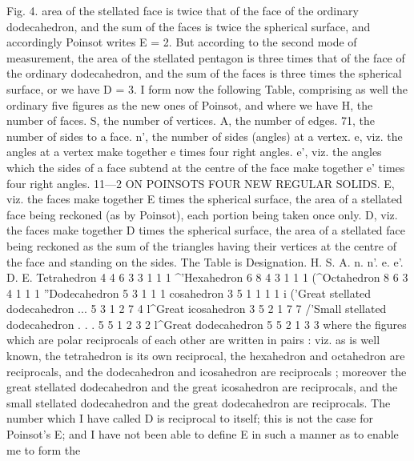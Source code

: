 \documentclass[11pt,a4paper]{book}
\begin{document}
Fig.  4.
area  of  the  stellated  face  is  twice  that  of  the  face  of  the  ordinary  dodecahedron,  and
the  sum  of  the  faces  is  twice  the  spherical  surface,  and  accordingly  Poinsot  writes
E  =  2.  But  according  to  the  second  mode  of  measurement,  the  area  of  the  stellated
pentagon  is  three  times  that  of  the  face  of  the  ordinary  dodecahedron,  and  the  sum  of
the  faces  is  three  times  the  spherical  surface,  or  we  have  D  =  3.
I    form  now   the   following  Table,   comprising  as   well   the    ordinary  five    figures  as
the  new  ones  of  Poinsot,  and  where  we  have
H,  the  number  of  faces.
S,    the  number  of  vertices.
A,  the  number  of  edges.
71,    the  number  of  sides  to  a  face.
n',  the  number  of  sides  (angles)  at  a  vertex.
e,    viz.  the  angles  at  a  vertex  make  together  e  times  four  right  angles.
e',   viz.    the  angles   which   the  sides  of   a   face  subtend   at   the   centre    of   the   face
make  together  e'  times  four  right  angles.
11—2
ON    POINSOTS    FOUR    NEW    REGULAR   SOLIDS.
E,  viz.  the  faces  make  together  E  times  the  spherical  surface,  the  area  of  a
stellated  face  being  reckoned  (as  by  Poinsot),  each  portion  being  taken  once  only.
D,  viz.  the  faces  make  together  D  times  the  spherical  surface,  the  area  of  a
stellated  face  being  reckoned  as  the  sum  of  the  triangles  having  their  vertices  at  the
centre  of  the  face  and  standing  on  the  sides.
The  Table  is
Designation.
H.
S.
A.
n.
n'.
e.
e'.
D.
E.
Tetrahedron
4
4
6
3
3
1
1
1
^'Hexahedron
6
8
4
3
1
1
1
(^Octahedron
8
6
3
4
1
1
1
''Dodecahedron
5
3
1
1
1
^^Icosahedron
3
5
1
1
1
1
i
('Great  stellated  dodecahedron  ...
5
3
1
2
7
4
l^Great  icosahedron
3
5
2
1
7
7
/'Small  stellated  dodecahedron  . . .
5
5
1
2
3
2
l^Great  dodecahedron
5
5
2
1
3
3
where  the  figures  which  are  polar  reciprocals  of  each  other  are  written  in  pairs :  viz.
as  is  well  known,  the  tetrahedron  is  its  own  reciprocal,  the  hexahedron  and  octahedron
are  reciprocals,  and  the  dodecahedron  and  icosahedron  are  reciprocals ;  moreover  the
great  stellated  dodecahedron  and  the  great  icosahedron  are  reciprocals,  and  the  small
stellated  dodecahedron  and  the  great  dodecahedron  are  reciprocals.  The  number  which
I  have  called  D  is  reciprocal  to  itself;  this  is  not  the  case  for  Poinsot's  E;  and  I
have  not  been  able  to  define  E  in  such  a  manner  as  to  enable  me  to  form  the
\end{document}
